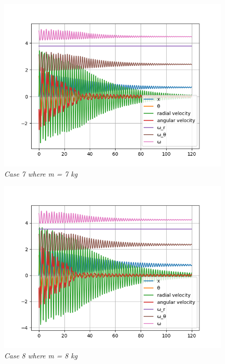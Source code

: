 \begin{figure}[H]
    \centering
    \includegraphics[width=15cm]{ExpPictures/m7.png}
    \caption{\textit{Case 7 where m = 7 kg}}
    \label{}
\end{figure}
        
\begin{figure}[H]
    \centering
    \includegraphics[width=15cm]{ExpPictures/m8.png}
    \caption{\textit{Case 8 where m = 8 kg}}
    \label{}
\end{figure}
        
